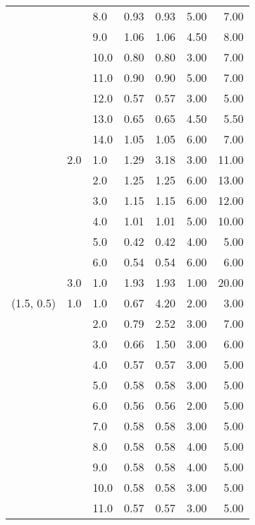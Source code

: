 \begin{tabular}{lllrrrr}
           &     & 8.0  &       0.93 &      0.93 & 5.00 &   7.00 \\
           &     & 9.0  &       1.06 &      1.06 & 4.50 &   8.00 \\
           &     & 10.0 &       0.80 &      0.80 & 3.00 &   7.00 \\
           &     & 11.0 &       0.90 &      0.90 & 5.00 &   7.00 \\
           &     & 12.0 &       0.57 &      0.57 & 3.00 &   5.00 \\
           &     & 13.0 &       0.65 &      0.65 & 4.50 &   5.50 \\
           &     & 14.0 &       1.05 &      1.05 & 6.00 &   7.00 \\
           & 2.0 & 1.0  &       1.29 &      3.18 & 3.00 &  11.00 \\
           &     & 2.0  &       1.25 &      1.25 & 6.00 &  13.00 \\
           &     & 3.0  &       1.15 &      1.15 & 6.00 &  12.00 \\
           &     & 4.0  &       1.01 &      1.01 & 5.00 &  10.00 \\
           &     & 5.0  &       0.42 &      0.42 & 4.00 &   5.00 \\
           &     & 6.0  &       0.54 &      0.54 & 6.00 &   6.00 \\
           & 3.0 & 1.0  &       1.93 &      1.93 & 1.00 &  20.00 \\
(1.5, 0.5) & 1.0 & 1.0  &       0.67 &      4.20 & 2.00 &   3.00 \\
           &     & 2.0  &       0.79 &      2.52 & 3.00 &   7.00 \\
           &     & 3.0  &       0.66 &      1.50 & 3.00 &   6.00 \\
           &     & 4.0  &       0.57 &      0.57 & 3.00 &   5.00 \\
           &     & 5.0  &       0.58 &      0.58 & 3.00 &   5.00 \\
           &     & 6.0  &       0.56 &      0.56 & 2.00 &   5.00 \\
           &     & 7.0  &       0.58 &      0.58 & 3.00 &   5.00 \\
           &     & 8.0  &       0.58 &      0.58 & 4.00 &   5.00 \\
           &     & 9.0  &       0.58 &      0.58 & 4.00 &   5.00 \\
           &     & 10.0 &       0.58 &      0.58 & 3.00 &   5.00 \\
           &     & 11.0 &       0.57 &      0.57 & 3.00 &   5.00 \\

\end{tabular}
